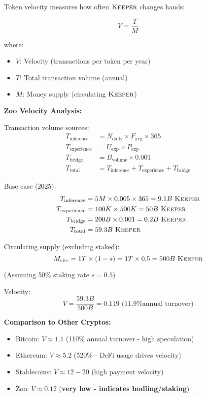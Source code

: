 \documentclass[11pt,letterpaper]{article}
\theoremstyle{definition}
\theoremstyle{remark}
\newcommand{\KEEPER}{\textsc{Keeper}}
\begin{document}
Token velocity measures how often $\KEEPER$ changes hands:

\begin{equation}
V = \frac{T}{M}
\end{equation}

where:
\begin{itemize}
\item $V$: Velocity (transactions per token per year)
\item $T$: Total transaction volume (annual)
\item $M$: Money supply (circulating $\KEEPER$)
\end{itemize}

\textbf{Zoo Velocity Analysis:}

Transaction volume sources:
\begin{align}
T_{\text{inference}} &= N_{\text{daily}} \times F_{\text{avg}} \times 365 \\
T_{\text{experience}} &= U_{\text{exp}} \times P_{\text{exp}} \\
T_{\text{bridge}} &= B_{\text{volume}} \times 0.001 \\
T_{\text{total}} &= T_{\text{inference}} + T_{\text{experience}} + T_{\text{bridge}}
\end{align}

Base case (2025):
\begin{align}
T_{\text{inference}} &= 5M \times 0.005 \times 365 = 9.1B \text{ } \KEEPER \\
T_{\text{experience}} &= 100K \times 500K = 50B \text{ } \KEEPER \\
T_{\text{bridge}} &= 200B \times 0.001 = 0.2B \text{ } \KEEPER \\
T_{\text{total}} &= 59.3B \text{ } \KEEPER
\end{align}

Circulating supply (excluding staked):
\begin{equation}
M_{\text{circ}} = 1T \times (1 - s) = 1T \times 0.5 = 500B \text{ } \KEEPER
\end{equation}

(Assuming 50\% staking rate $s = 0.5$)

Velocity:
\begin{equation}
V = \frac{59.3B}{500B} = 0.119 \text{ (11.9\% annual turnover)}
\end{equation}

\textbf{Comparison to Other Cryptos:}
\begin{itemize}
\item Bitcoin: $V \approx 1.1$ (110\% annual turnover - high speculation)
\item Ethereum: $V \approx 5.2$ (520\% - DeFi usage drives velocity)
\item Stablecoins: $V \approx 12-20$ (high payment velocity)
\item Zoo: $V \approx 0.12$ (\textbf{very low - indicates hodling/staking})
\end{itemize}
\end{document}
